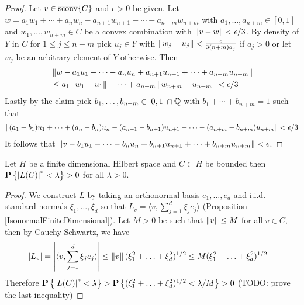 \begin{proof}
Let $v \in \overline{\operatorname*{sconv}}\{C\}$ and $\epsilon > 0$ be given.
Let $w = a_1 w_1 + \dotsb + a_n w_n - a_{n+1} w_{n+1} - \dotsb - a_{n+m} w_{n+m}$ with $a_1, \dotsc, a_{n+m} \in [0,1]$ and $w_1, \dotsc, w_{n+m} \in C$ be a convex combination with $\left \lVert v - w \right \rVert < \epsilon/3$.  By density of $Y$ in $C$ for 
$1 \leq j \leq n+m$ pick $u_j \in Y$ with $\left \lVert w_j - u_j \right \rVert < \frac{\epsilon}{3(n+m) a_j}$ if $a_j > 0$ or let $w_j$ be an arbitrary element of $Y$ otherwise.  Then
\begin{align*}
&\left \lVert w - a_1 u_1 - \dotsb - a_n u_n + a_{n+1} u_{n+1} + \dotsb + a_{n+m} u_{n+m} \right \rVert \\
&\leq a_1 \left \lVert w_1 - u_1 \right \rVert + \dotsb + a_{n+m} \left \lVert w_{n+m} - u_{n+m} \right \rVert < \epsilon/3
\end{align*}
Lastly by the claim pick $b_1, \dotsc, b_{n+m} \in [0,1] \cap \mathbb{Q}$ with $b_1 + \dotsb + b_{n+m}=1$ such that 
\begin{align*}
\left \lVert (a_1 - b_1) u_1 + \dotsb + (a_n - b_n) u_n - (a_{n+1} -b_{n+1}) u_{n+1} - \dotsb - (a_{n+m} - b_{n+m}) u_{n+m} \right \rVert < \epsilon/3
\end{align*}
It follows that $\left \lVert v - b_1 u_1 - \dotsb - b_n u_n + b_{n+1} u_{n+1} + \dotsb + b_{n+m} u_{n+m} \right \rVert < \epsilon$.
\end{proof}

\begin{lem}\label{lem:IsonormalFiniteDimensionalBoundedPositiveProbability}Let $H$ be a finite dimensional Hilbert space and $C \subset H$ be bounded then $\textbf{P}\left \{\left \vert L(C) \right \vert^* < \lambda \right \} > 0$ for all $\lambda > 0$.
\end{lem}
\begin{proof}
We construct $L$ by taking an orthonormal basis $e_1, \dotsc, e_d$ and i.i.d. standard normals $\xi_1, \dotsc, \xi_d$ so that $L_v = \langle v, \sum_{j=1}^d \xi_j e_j \rangle$ (Proposition \ref{IsonormalFiniteDimensional}).  Let $M > 0$ be such that $\left \lVert v \right \rVert \leq M$ for all $v \in C$, then by Cauchy-Schwartz, we have
\begin{align*}
\left \vert L_v \right \vert &= \left \vert \langle v, \sum_{j=1}^d \xi_j e_j \rangle \right \vert \leq \left \lVert v \right \rVert (\xi_1^2 + \dotsc + \xi_d^2)^{1/2} \leq M (\xi_1^2 + \dotsc + \xi_d^2)^{1/2}
\end{align*}
Therefore $\textbf{P}\left \{\left \vert L(C) \right \vert^* < \lambda \right \} > \textbf{P}\left \{(\xi_1^2 + \dotsc + \xi_d^2)^{1/2} < \lambda/M \right \} > 0$ (TODO: prove the last inequality)
\end{proof}


